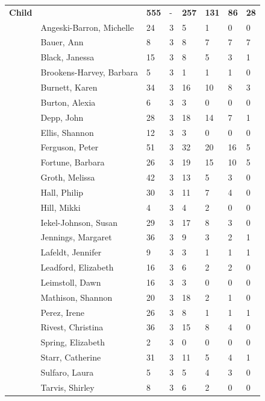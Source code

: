 \documentclass{article}\usepackage[]{graphicx}\usepackage[]{color}
\begin{document}
{\begin{longtable} { >{\raggedright}p{}p{}p{}p{}p{}p{}p{}p{}}
\textbf{Child} &  & \textbf{555} & - & \textbf{257} & \textbf{131} & \textbf{86} & \textbf{28} \\ 
   & Angeski-Barron, Michelle & 24 & 3 & 5 & 1 & 0 & 0 \\ 
   & Bauer, Ann & 8 & 3 & 8 & 7 & 7 & 7 \\ 
   & Black, Janessa & 15 & 3 & 8 & 5 & 3 & 1 \\ 
   \rowcolor[gray]{0.90} & Brookens-Harvey, Barbara & 5 & 3 & 1 & 1 & 1 & 0 \\ 
   \rowcolor[gray]{0.90} & Burnett, Karen & 34 & 3 & 16 & 10 & 8 & 3 \\ 
   \rowcolor[gray]{0.90} & Burton, Alexia & 6 & 3 & 3 & 0 & 0 & 0 \\ 
   & Depp, John & 28 & 3 & 18 & 14 & 7 & 1 \\ 
   & Ellis, Shannon & 12 & 3 & 3 & 0 & 0 & 0 \\ 
   & Ferguson, Peter & 51 & 3 & 32 & 20 & 16 & 5 \\ 
   \rowcolor[gray]{0.90} & Fortune, Barbara & 26 & 3 & 19 & 15 & 10 & 5 \\ 
   \rowcolor[gray]{0.90} & Groth, Melissa & 42 & 3 & 13 & 5 & 3 & 0 \\ 
   \rowcolor[gray]{0.90} & Hall, Philip & 30 & 3 & 11 & 7 & 4 & 0 \\ 
   & Hill, Mikki & 4 & 3 & 4 & 2 & 0 & 0 \\ 
   & Iekel-Johnson, Susan & 29 & 3 & 17 & 8 & 3 & 0 \\ 
   & Jennings, Margaret & 36 & 3 & 9 & 3 & 2 & 1 \\ 
   \rowcolor[gray]{0.90} & Lafeldt, Jennifer & 9 & 3 & 3 & 1 & 1 & 1 \\ 
   \rowcolor[gray]{0.90} & Leadford, Elizabeth & 16 & 3 & 6 & 2 & 2 & 0 \\ 
   \rowcolor[gray]{0.90} & Leimstoll, Dawn & 16 & 3 & 3 & 0 & 0 & 0 \\ 
   & Mathison, Shannon & 20 & 3 & 18 & 2 & 1 & 0 \\ 
   & Perez, Irene & 26 & 3 & 8 & 1 & 1 & 1 \\ 
   & Rivest, Christina & 36 & 3 & 15 & 8 & 4 & 0 \\ 
   \rowcolor[gray]{0.90} & Spring, Elizabeth & 2 & 3 & 0 & 0 & 0 & 0 \\ 
   \rowcolor[gray]{0.90} & Starr, Catherine & 31 & 3 & 11 & 5 & 4 & 1 \\ 
   \rowcolor[gray]{0.90} & Sulfaro, Laura & 5 & 3 & 5 & 4 & 3 & 0 \\ 
   & Tarvis, Shirley & 8 & 3 & 6 & 2 & 0 & 0 \\ 

\end{longtable}}
\end{document}
